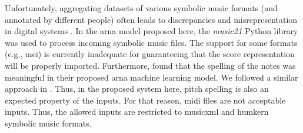 
Unfortunately, aggregating datasets of various symbolic
music formats (and annotated by different people) often
leads to discrepancies and misrepresentation in digital
systems \parencite{napoleslopez2018encoding,
napoleslopez2019effects}. In the \gls{arna} model proposed
here, the \emph{music21} Python library
\parencite{cuthbert2010music21} was used to process incoming
symbolic music files. The support for some formats (e.g.,
\gls{mei}) is currently inadequate for guaranteeing that the
score representation will be properly imported. Furthermore,
\textcite{micchi2020not} found that the spelling of the
notes was meaningful in their proposed \gls{arna} machine
learning model. We followed a similar approach in
\textcite{napoleslopez2021augmentednet}. Thus, in the
proposed system here, pitch spelling is also an expected
property of the inputs. For that reason, \gls{midi} files
are not acceptable inputs. Thus, the allowed inputs are
restricted to \gls{musicxml} and \gls{humkern} symbolic
music formats.

